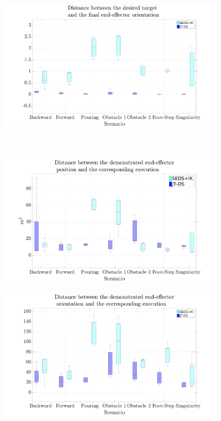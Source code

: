 \documentclass[10pt,stdletter,dateno]{newlfm}
\begin{document}
\begin{newlfm}
\begin{enumerate}
{\begin{figure}[t]
\begin{subfigure}[t]{0.63\textwidth}
		\caption{}
		\label{fig:SEDSvsJTDSP:E}
	\end{subfigure}%
	\hspace{-0.2cm}
	\begin{subfigure}[t]{0.63\textwidth}
	\centering
		\includegraphics[trim={2cm 0.0cm 3.25cm 0cm},clip,width=\textwidth]{Pics/SEDS_JT_O_End.pdf}
		\caption{ }
		\label{fig:SEDSvsJTDSO:E}
	\end{subfigure}\\		 
	\hspace*{-2.4cm}\begin{subfigure}[t]{0.63\textwidth}
			\includegraphics[trim={2cm 0.0cm 3.25cm 0cm},clip,width=\textwidth]{Pics/SEDS_JT_P.pdf}
		\caption{ }
			\label{fig:SEDSvsJTDSP}
		\end{subfigure}%
		\begin{subfigure}[t]{0.63\textwidth}
			\includegraphics[trim={2cm 0.0cm 3.25cm 0cm},clip,width=\textwidth]{Pics/SEDS_JT_O.pdf}

\end{subfigure}
\end{figure}}
\end{enumerate}
\end{newlfm}
\end{document}
